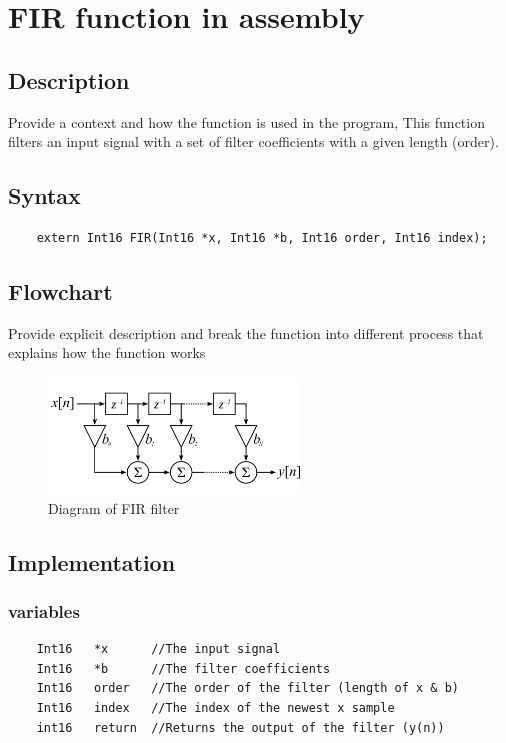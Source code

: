 
\section{FIR function in assembly}


\subsection{Description}
Provide a context and how the function is used in the program,
This function filters an input signal with a set of filter coefficients with a given length (order).

\subsection{Syntax} 
\begin{lstlisting}
	extern Int16 FIR(Int16 *x, Int16 *b, Int16 order, Int16 index);
\end{lstlisting}

\subsection{Flowchart}
Provide explicit description and break the function into different process that explains how the function works
\begin{figure} [h]
	\centering
	\includegraphics[width=0.6\textwidth]{../Journal/Code/FIRfilter}
	\caption{Diagram of FIR filter}
	\label{Fig:FIR_filter}
\end{figure}


\subsection{Implementation}

\subsubsection{variables}
\begin{lstlisting}
	Int16 	*x 		//The input signal
	Int16	*b		//The filter coefficients
	Int16	order	//The order of the filter (length of x & b)
	Int16	index	//The index of the newest x sample
	int16	return	//Returns the output of the filter (y(n))
\end{lstlisting}

